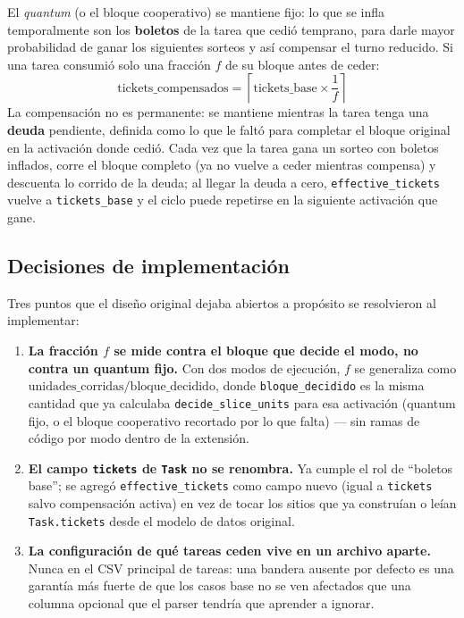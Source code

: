 El \textit{quantum} (o el bloque cooperativo) se mantiene fijo: lo que se
infla temporalmente son los \textbf{boletos} de la tarea que cedió temprano,
para darle mayor probabilidad de ganar los siguientes sorteos y así
compensar el turno reducido. Si una tarea consumió solo una fracción $f$ de
su bloque antes de ceder:
\begin{equation}
\text{tickets\_compensados} = \left\lceil \text{tickets\_base} \times \frac{1}{f} \right\rceil
\label{eq:compensacion}
\end{equation}
La compensación no es permanente: se mantiene mientras la tarea tenga una
\textbf{deuda} pendiente, definida como lo que le faltó para completar el
bloque original en la activación donde cedió. Cada vez que la tarea gana un
sorteo con boletos inflados, corre el bloque completo (ya no vuelve a ceder
mientras compensa) y descuenta lo corrido de la deuda; al llegar la deuda a
cero, \texttt{effective\_tickets} vuelve a \texttt{tickets\_base} y el ciclo
puede repetirse en la siguiente activación que gane.

\subsection{Decisiones de implementación}

Tres puntos que el diseño original dejaba abiertos a propósito se
resolvieron al implementar:

\begin{enumerate}
\item \textbf{La fracción $f$ se mide contra el bloque que decide el modo,
  no contra un quantum fijo.} Con dos modos de ejecución, $f$ se generaliza
  como $\text{unidades\_corridas} / \text{bloque\_decidido}$, donde
  \texttt{bloque\_decidido} es la misma cantidad que ya calculaba
  \texttt{decide\_slice\_units} para esa activación (quantum fijo, o el
  bloque cooperativo recortado por lo que falta) --- sin ramas de código por
  modo dentro de la extensión.
\item \textbf{El campo \texttt{tickets} de \texttt{Task} no se renombra.}
  Ya cumple el rol de ``boletos base''; se agregó \texttt{effective\_tickets}
  como campo nuevo (igual a \texttt{tickets} salvo compensación activa) en
  vez de tocar los sitios que ya construían o leían \texttt{Task.tickets}
  desde el modelo de datos original.
\item \textbf{La configuración de qué tareas ceden vive en un archivo
  aparte.} Nunca en el CSV principal de tareas: una bandera ausente por
  defecto es una garantía más fuerte de que los casos base no se ven
  afectados que una columna opcional que el parser tendría que aprender a
  ignorar.
\end{enumerate}

